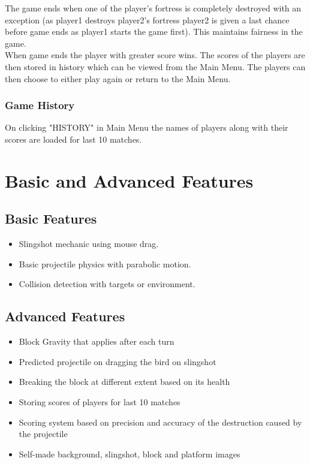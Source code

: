 \documentclass[12pt]{article}
\newcounter{subsubsubsection}[subsubsection]
\begin{document}
The game ends when one of the player's fortress is completely destroyed with an exception (as player1 destroys player2's fortress player2 is given a last chance before game ends as player1 starts the game first). This maintains fairness in the game.\\ 
When game ends the player with greater score wins. The scores of the players are then stored in history which can be viewed from the Main Menu. The players can then choose to either play again or return to the Main Menu.\\

\subsubsection{Game History}
On clicking "HISTORY" in Main Menu the names of players along with their scores are loaded for last 10 matches.\\

\section{Basic and Advanced Features}
\subsection{Basic Features}
\begin{itemize}
    \item Slingshot mechanic using mouse drag.
    \item Basic projectile physics with parabolic motion.
    \item Collision detection with targets or environment.
\end{itemize}

\subsection{Advanced Features}
\begin{itemize}
    \item Block Gravity that applies after each turn
    \item Predicted projectile on dragging the bird on slingshot
    \item Breaking the block at different extent based on its health
    \item Storing scores of players for last 10 matches
    \item Scoring system based on precision and accuracy of the destruction caused by the projectile
    \item Self-made background, slingshot, block and platform images
\end{itemize}\\
\end{document}

